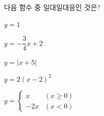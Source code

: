 다음 함수 중 일대일대응인 것은? 
\begin{choicesii}{\rule[-3ex]{0pt}{8ex}$y=1$}{\rule[-3ex]{0pt}{8ex}$y=-\dfrac{3}{4}x+2$}{\rule[-3ex]{0pt}{8ex}$y=|x+5|$}{\rule[-3ex]{0pt}{8ex}$y=2(x-2)^2$}{\rule[-3ex]{0pt}{8ex}$y=\begin{cases} x & (x\ge 0) \\ -2x & (x<0) \end{cases}$}\end{choicesii}

